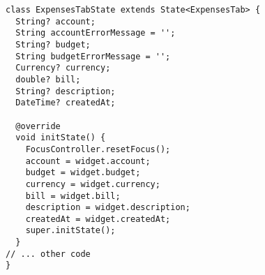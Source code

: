 \begin{lstlisting}
class ExpensesTabState extends State<ExpensesTab> {
  String? account;
  String accountErrorMessage = '';
  String? budget;
  String budgetErrorMessage = '';
  Currency? currency;
  double? bill;
  String? description;
  DateTime? createdAt;

  @override
  void initState() {
    FocusController.resetFocus();
    account = widget.account;
    budget = widget.budget;
    currency = widget.currency;
    bill = widget.bill;
    description = widget.description;
    createdAt = widget.createdAt;
    super.initState();
  }
// ... other code
}
\end{lstlisting}

